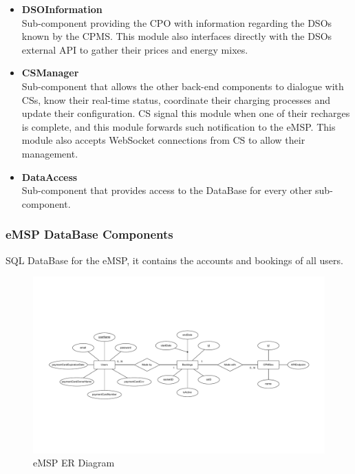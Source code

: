 \documentclass[11pt]{article}
\begin{document}
\begin{itemize}
    \item \textbf{DSOInformation} \\
        Sub-component providing the CPO with information regarding the DSOs known by the CPMS. This module also interfaces directly with the DSOs external API to gather their prices and energy mixes. 
    \item \textbf{CSManager} \\
        Sub-component that allows the other back-end components to dialogue with CSs, know their real-time status, coordinate their charging processes and update their configuration. CS signal this module when one of their recharges is complete, and this module forwards such notification to the eMSP. This module also accepts WebSocket connections from CS to allow their management.
    \item \textbf{DataAccess} \\
        Sub-component that provides access to the DataBase for every other sub-component.
\end{itemize}

\newpage

\subsubsection{eMSP DataBase Components}

SQL DataBase for the eMSP, it contains the accounts and bookings of all users.

\begin{figure}[!ht]
    \centering
    \includegraphics[page={1}, trim=1.5cm 6cm 1.5cm 6cm, width=\linewidth, clip]{ERDiagrams.pdf}
    \caption{eMSP ER Diagram}
\end{figure}
\end{document}

